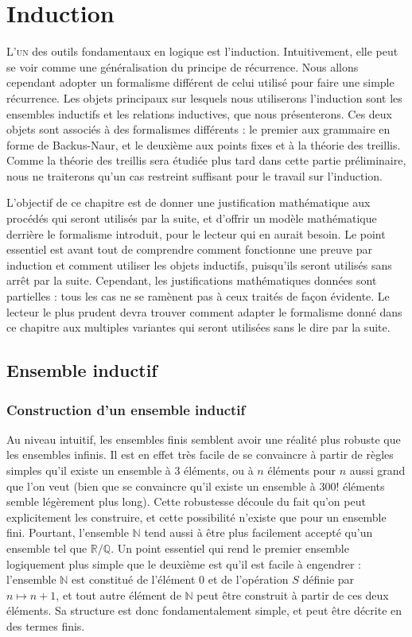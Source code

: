 \chapter{Induction}
\label{chp.induction}

\minitoc

\lettrine{L}{'un} des outils fondamentaux en logique est l'induction.
Intuitivement, elle peut se voir comme une généralisation du principe de
récurrence. Nous allons cependant adopter un formalisme différent de celui
utilisé pour faire une simple récurrence. Les objets principaux sur lesquels
nous utiliserons l'induction sont les ensembles inductifs et les relations
inductives, que nous présenterons. Ces deux objets sont associés à des
formalismes différents : le premier aux grammaire en forme de Backus-Naur, et le
deuxième aux points fixes et à la théorie des treillis. Comme la théorie des
treillis sera étudiée plus tard dans cette partie préliminaire, nous ne
traiterons qu'un cas restreint suffisant pour le travail sur l'induction.

L'objectif de ce chapitre est de donner une justification mathématique aux
procédés qui seront utilisés par la suite, et d'offrir un modèle mathématique
derrière le formalisme introduit, pour le lecteur qui en aurait besoin. Le point
essentiel est avant tout de comprendre comment fonctionne une preuve par
induction et comment utiliser les objets inductifs, puisqu'ils seront utilisés
sans arrêt par la suite. Cependant, les justifications mathématiques données
sont partielles : tous les cas ne se ramènent pas à ceux traités de façon
évidente. Le lecteur le plus prudent devra trouver comment adapter le formalisme
donné dans ce chapitre aux multiples variantes qui seront utilisées sans le dire
par la suite.

\section{Ensemble inductif}

\subsection{Construction d'un ensemble inductif}

Au niveau intuitif, les ensembles finis semblent avoir une réalité plus
robuste que les ensembles infinis. Il est en effet très facile de se convaincre
à partir de règles simples qu'il existe un ensemble à $3$ éléments, ou à $n$
éléments pour $n$ aussi grand que l'on veut (bien que se convaincre qu'il existe
un ensemble à $300!$ éléments semble légèrement plus long). Cette robustesse
découle du fait qu'on peut explicitement les construire, et cette possibilité
n'existe que pour un ensemble fini. Pourtant, l'ensemble $\mathbb N$ tend aussi
à être plus facilement accepté qu'un ensemble tel que $\mathbb R / \mathbb Q$.
Un point essentiel qui rend le premier ensemble logiquement plus simple que le
deuxième est qu'il est facile à engendrer : l'ensemble $\mathbb N$ est constitué
de l'élément $0$ et de l'opération $S$ définie par $n \mapsto n + 1$, et tout
autre élément de $\mathbb N$ peut être construit à partir de ces deux éléments.
Sa structure est donc fondamentalement simple, et peut être décrite en des
termes finis.

